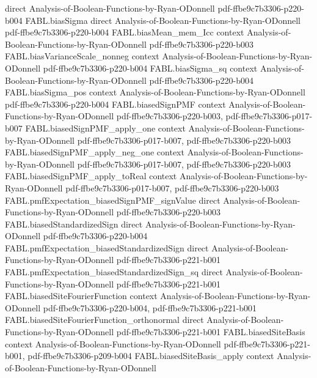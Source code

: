 \begin{theorem}
  {direct}
  {Analysis-of-Boolean-Functions-by-Ryan-ODonnell}
  {pdf-ffbe9c7b3306-p220-b004}
\proofstep
  {FABL.biasSigma}
  {direct}
  {Analysis-of-Boolean-Functions-by-Ryan-ODonnell}
  {pdf-ffbe9c7b3306-p220-b004}
\proofstep
  {FABL.biasMean_mem_Icc}
  {context}
  {Analysis-of-Boolean-Functions-by-Ryan-ODonnell}
  {pdf-ffbe9c7b3306-p220-b003}
\proofstep
  {FABL.biasVarianceScale_nonneg}
  {context}
  {Analysis-of-Boolean-Functions-by-Ryan-ODonnell}
  {pdf-ffbe9c7b3306-p220-b004}
\proofstep
  {FABL.biasSigma_sq}
  {context}
  {Analysis-of-Boolean-Functions-by-Ryan-ODonnell}
  {pdf-ffbe9c7b3306-p220-b004}
\proofstep
  {FABL.biasSigma_pos}
  {context}
  {Analysis-of-Boolean-Functions-by-Ryan-ODonnell}
  {pdf-ffbe9c7b3306-p220-b004}
\proofstep
  {FABL.biasedSignPMF}
  {context}
  {Analysis-of-Boolean-Functions-by-Ryan-ODonnell}
  {pdf-ffbe9c7b3306-p220-b003,
    pdf-ffbe9c7b3306-p017-b007}
\proofstep
  {FABL.biasedSignPMF_apply_one}
  {context}
  {Analysis-of-Boolean-Functions-by-Ryan-ODonnell}
  {pdf-ffbe9c7b3306-p017-b007,
    pdf-ffbe9c7b3306-p220-b003}
\proofstep
  {FABL.biasedSignPMF_apply_neg_one}
  {context}
  {Analysis-of-Boolean-Functions-by-Ryan-ODonnell}
  {pdf-ffbe9c7b3306-p017-b007,
    pdf-ffbe9c7b3306-p220-b003}
\proofstep
  {FABL.biasedSignPMF_apply_toReal}
  {context}
  {Analysis-of-Boolean-Functions-by-Ryan-ODonnell}
  {pdf-ffbe9c7b3306-p017-b007,
    pdf-ffbe9c7b3306-p220-b003}
\proofstep
  {FABL.pmfExpectation_biasedSignPMF_signValue}
  {direct}
  {Analysis-of-Boolean-Functions-by-Ryan-ODonnell}
  {pdf-ffbe9c7b3306-p220-b003}
\proofstep
  {FABL.biasedStandardizedSign}
  {direct}
  {Analysis-of-Boolean-Functions-by-Ryan-ODonnell}
  {pdf-ffbe9c7b3306-p220-b004}
\proofstep
  {FABL.pmfExpectation_biasedStandardizedSign}
  {direct}
  {Analysis-of-Boolean-Functions-by-Ryan-ODonnell}
  {pdf-ffbe9c7b3306-p221-b001}
\proofstep
  {FABL.pmfExpectation_biasedStandardizedSign_sq}
  {direct}
  {Analysis-of-Boolean-Functions-by-Ryan-ODonnell}
  {pdf-ffbe9c7b3306-p221-b001}
\proofstep
  {FABL.biasedSiteFourierFunction}
  {context}
  {Analysis-of-Boolean-Functions-by-Ryan-ODonnell}
  {pdf-ffbe9c7b3306-p220-b004,
    pdf-ffbe9c7b3306-p221-b001}
\proofstep
  {FABL.biasedSiteFourierFunction_orthonormal}
  {direct}
  {Analysis-of-Boolean-Functions-by-Ryan-ODonnell}
  {pdf-ffbe9c7b3306-p221-b001}
\proofstep
  {FABL.biasedSiteBasis}
  {context}
  {Analysis-of-Boolean-Functions-by-Ryan-ODonnell}
  {pdf-ffbe9c7b3306-p221-b001,
    pdf-ffbe9c7b3306-p209-b004}
\proofstep
  {FABL.biasedSiteBasis_apply}
  {context}
  {Analysis-of-Boolean-Functions-by-Ryan-ODonnell}

\end{theorem}
